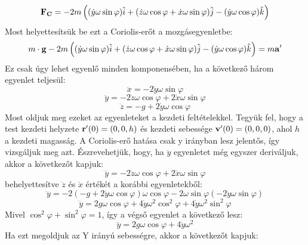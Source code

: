 \documentclass[a4paper,12pt]{article}
\begin{document}
\begin{equation}
    \bold{F_{C}} = -2m\left((\dot{y}\omega\sin\varphi)\hat{i} + (\dot{z}\omega\cos\varphi + \dot{x}\omega\sin\varphi)\hat{j} - (\dot{y}\omega\cos\varphi)\hat{k}\right)
\end{equation}
Most helyettesítsük be ezt a Coriolis-erőt a mozgásegyenletbe:
\begin{equation}
    m\cdot \bold{g} - 2m\left((\dot{y}\omega\sin\varphi)\hat{i} + (\dot{z}\omega\cos\varphi + \dot{x}\omega\sin\varphi)\hat{j} - (\dot{y}\omega\cos\varphi)\hat{k}\right) = m\bold{a'}
\end{equation}
Ez csak úgy lehet egyenlő minden komponensében, ha a következő három egyenlet teljesül:
\begin{equation}
    \ddot{x} = -2\dot{y}\omega\sin\varphi
\end{equation}
\begin{equation}
    \ddot{y} = -2\dot{z}\omega\cos\varphi + 2\dot{x}\omega\sin\varphi
\end{equation}
\begin{equation}
    \ddot{z} = -g + 2\dot{y}\omega\cos\varphi
\end{equation}
Most oldjuk meg ezeket az egyenleteket a kezdeti feltételekkel. Tegyük fel, hogy a test kezdeti helyzete $\bold{r'}(0) = (0, 0, h)$ és kezdeti sebessége $\bold{v'}(0) = (0, 0, 0)$, ahol $h$ a kezdeti magasság.
A Coriolis-erő hatása csak y irányban lesz jelentős, így vizsgáljuk meg azt. Észrevehetjük, hogy, ha $\ddot{y}$ egyenletet még egyszer deriváljuk, akkor a következőt kapjuk:
\begin{equation}
    \dddot{y} = -2\ddot{z}\omega\cos\varphi + 2\ddot{x}\omega\sin\varphi
\end{equation}
behelyettesítve $\ddot{z}$ és $\ddot{x}$ értékét a korábbi egyenletekből:
\begin{equation}
    \dddot{y} = -2(-g + 2\dot{y}\omega\cos\varphi)\omega\cos\varphi - 2\omega\sin\varphi(-2\dot{y}\omega\sin\varphi)
\end{equation}
\begin{equation}
    \dddot{y} = 2g\omega\cos\varphi + 4\dot{y}\omega^2\cos^2\varphi + 4\dot{y}\omega^2\sin^2\varphi
\end{equation}
Mivel $\cos^2\varphi + \sin^2\varphi = 1$, így a végső egyenlet a következő lesz:
\begin{equation}
    \dddot{y} = 2g\omega\cos\varphi + 4\dot{y}\omega^2
\end{equation}
Ha ezt megoldjuk az Y irányú sebességre, akkor a következőt kapjuk:
\end{document}
